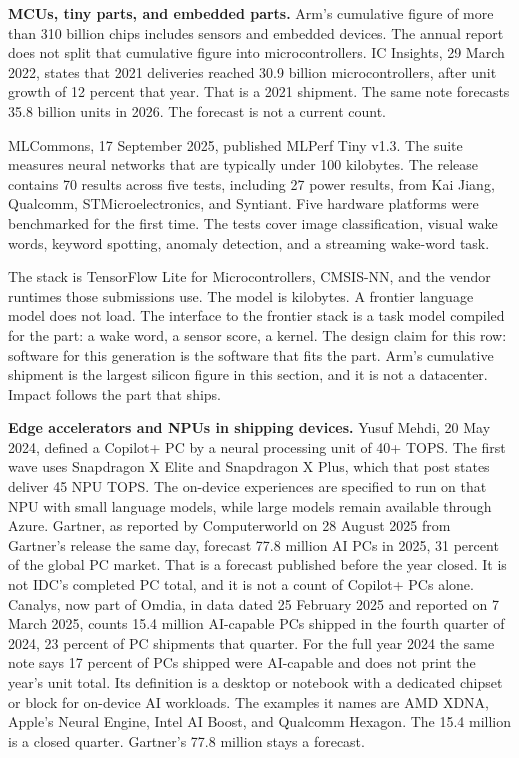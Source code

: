 \documentclass[
  10pt,
]{article}
\begin{document}
\textbf{MCUs, tiny parts, and embedded parts.} Arm's cumulative figure
of more than 310 billion chips includes sensors and embedded devices.
The annual report does not split that cumulative figure into
microcontrollers. IC Insights, 29 March 2022, states that 2021
deliveries reached 30.9 billion microcontrollers, after unit growth of
12 percent that year. That is a 2021 shipment. The same note forecasts
35.8 billion units in 2026. The forecast is not a current count.

MLCommons, 17 September 2025, published MLPerf Tiny v1.3. The suite
measures neural networks that are typically under 100 kilobytes. The
release contains 70 results across five tests, including 27 power
results, from Kai Jiang, Qualcomm, STMicroelectronics, and Syntiant.
Five hardware platforms were benchmarked for the first time. The tests
cover image classification, visual wake words, keyword spotting, anomaly
detection, and a streaming wake-word task.

The stack is TensorFlow Lite for Microcontrollers, CMSIS-NN, and the
vendor runtimes those submissions use. The model is kilobytes. A
frontier language model does not load. The interface to the frontier
stack is a task model compiled for the part: a wake word, a sensor
score, a kernel. The design claim for this row: software for this
generation is the software that fits the part. Arm's cumulative shipment
is the largest silicon figure in this section, and it is not a
datacenter. Impact follows the part that ships.

\textbf{Edge accelerators and NPUs in shipping devices.} Yusuf Mehdi, 20
May 2024, defined a Copilot+ PC by a neural processing unit of 40+ TOPS.
The first wave uses Snapdragon X Elite and Snapdragon X Plus, which that
post states deliver 45 NPU TOPS. The on-device experiences are specified
to run on that NPU with small language models, while large models remain
available through Azure. Gartner, as reported by Computerworld on 28
August 2025 from Gartner's release the same day, forecast 77.8 million
AI PCs in 2025, 31 percent of the global PC market. That is a forecast
published before the year closed. It is not IDC's completed PC total,
and it is not a count of Copilot+ PCs alone. Canalys, now part of Omdia,
in data dated 25 February 2025 and reported on 7 March 2025, counts 15.4
million AI-capable PCs shipped in the fourth quarter of 2024, 23 percent
of PC shipments that quarter. For the full year 2024 the same note says
17 percent of PCs shipped were AI-capable and does not print the year's
unit total. Its definition is a desktop or notebook with a dedicated
chipset or block for on-device AI workloads. The examples it names are
AMD XDNA, Apple's Neural Engine, Intel AI Boost, and Qualcomm Hexagon.
The 15.4 million is a closed quarter. Gartner's 77.8 million stays a
forecast.
\end{document}
